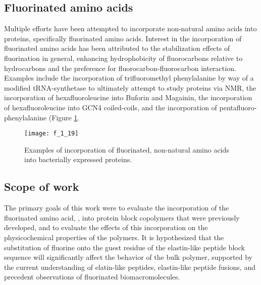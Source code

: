 \begin{refsection}
\subsection{Fluorinated amino acids}


Multiple efforts have been attempted to incorporate non-natural amino acids into
proteins, specifically fluorinated amino
acids.\cite{Meng2007,Lee2004,Son2006,Li2010a,Woll2006} Interest in the
incorporation of fluorinated amino acids has been attributed to the
stabilization effects of fluorination in general, enhancing hydrophobicity of
fluorocarbons relative to hydrocarbons and the preference for
fluorocarbon-fluorocarbon
interaction.\cite{Woll2006,Lee2004,Marsh2009,Jackel2006,Yoder2002} Examples
include the incorporation of trifluoromethyl phenylalanine by way of a modified
tRNA-synthetase to ultimately attempt to study  proteins via
NMR,\cite{Li2010a,Jackson2007} the incorporation of hexafluoroleucine into
Buforin and Magainin,\cite{Meng2007} the incorporation of hexafluoroleucine into
GCN4 coiled-coils,\cite{Lee2004} and the incorporation of
pentafluoro-phenylalanine\cite{Woll2006} (Figure \ref{fig:fluorination_examples}.
\begin{figure}[h!] \centering \texttt{[image: f\_1\_19]}
    \caption[Examples of incorporation of fluorinated, non-natural amino acids.]{Examples of incorporation of fluorinated, non-natural amino acids
        into bacterially expressed proteins.\cite{Jackson2007,Meng2007,Lee2004,Woll2006}}\label{fig:fluorination_examples} \end{figure}

\subsection{Scope of work}

The primary goals of this work were to evaluate the incorporation of
the fluorinated amino acid, , into protein block
copolymers that were previously developed, and to evaluate the effects of this
incorporation on the physicochemical properties of the polymers.
It is hypothesized that the substitution of fluorine onto the guest residue of
the elastin-like peptide block sequence will significantly affect the behavior
of the bulk polymer, supported by the current understanding of elatin-like
peptides, elastin-like peptide fusions, and precedent observations of
fluorinated biomacromolecules.


\end{refsection}
